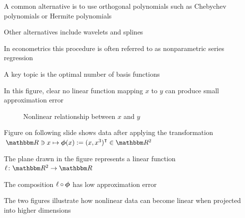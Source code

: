 \begin{frame}

    \vspace{2em}
    \Eg
    A common alternative is to use orthogonal polynomials such as Chebychev
    polynomials or Hermite polynomials
    
    Other
    alternatives include wavelets and splines
    
    \vspace{.7em}
    In econometrics this procedure
    is often referred to as nonparametric series regression
    
    A key topic is the optimal number of basis functions
    
\end{frame}

\begin{frame}

    \vspace{2em}
    In this figure, clear no linear function mapping $x$ to $y$ 
    can produce small approximation error
     
    \begin{figure}
    \centering
    \caption{ Nonlinear relationship between $x$ and $y$}
    \end{figure}
    
\end{frame}

\begin{frame}

    \vspace{2em}
    Figure on following slide shows data after applying
    the transformation $\RR \ni x \mapsto \boldphi(x) := (x, x^3)^\T \in \RR^2$
    
    The
    plane drawn in the figure represents a linear function $\ell \colon
    \RR^2 \to \RR$
    
    \vspace{.7em}
    The composition $\ell \circ {\boldsymbol \phi}$ has low approximation
    error
    
    The two figures illustrate how nonlinear data can become linear when
    projected into higher dimensions
    
\end{frame}

